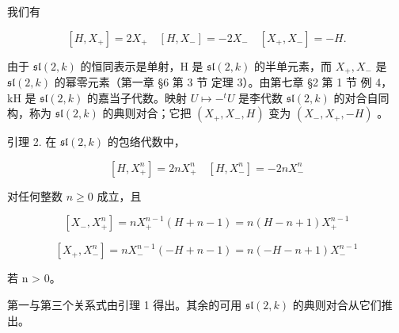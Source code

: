 我们有

\[
[ H, X _ {+} ] = 2 X _ {+} \quad [ H, X _ {-} ] = - 2 X _ {-} \quad [ X _ {+}, X _ {-} ] = - H.\tag{1}
\]

由于 \(\mathfrak{sl}(2,k)\) 的恒同表示是单射，H 是 \(\mathfrak{sl}(2,k)\) 的半单元素，而 \(X_{+}, X_{-}\) 是 \(\mathfrak{sl}(2,k)\) 的幂零元素（第一章 §6 第 3 节 定理 3）。由第七章 §2 第 1 节 例 4，kH 是 \(\mathfrak{sl}(2,k)\) 的嘉当子代数。映射 \(U \mapsto -^{t}U\) 是李代数 \(\mathfrak{sl}(2,k)\) 的对合自同构，称为 \(\mathfrak{sl}(2,k)\) 的典则对合；它把 \((X_{+}, X_{-}, H)\) 变为 \((X_{-}, X_{+}, -H)\) 。

引理 2. 在 \(\mathfrak{sl}(2,k)\) 的包络代数中，

\[
[ H, X _ {+} ^ {n} ] = 2 n X _ {+} ^ {n} \quad [ H, X _ {-} ^ {n} ] = - 2 n X _ {-} ^ {n}
\]

对任何整数 \(n \geq 0\) 成立，且

\[
[ X _ {-}, X _ {+} ^ {n} ] = n X _ {+} ^ {n - 1} (H + n - 1) = n (H - n + 1) X _ {+} ^ {n - 1}
\]

\[
[ X _ {+}, X _ {-} ^ {n} ] = n X _ {-} ^ {n - 1} (- H + n - 1) = n (- H - n + 1) X _ {-} ^ {n - 1}
\]

若 n \textgreater{} 0。

第一与第三个关系式由引理 1 得出。其余的可用 \(\mathfrak{sl}(2,k)\) 的典则对合从它们推出。

